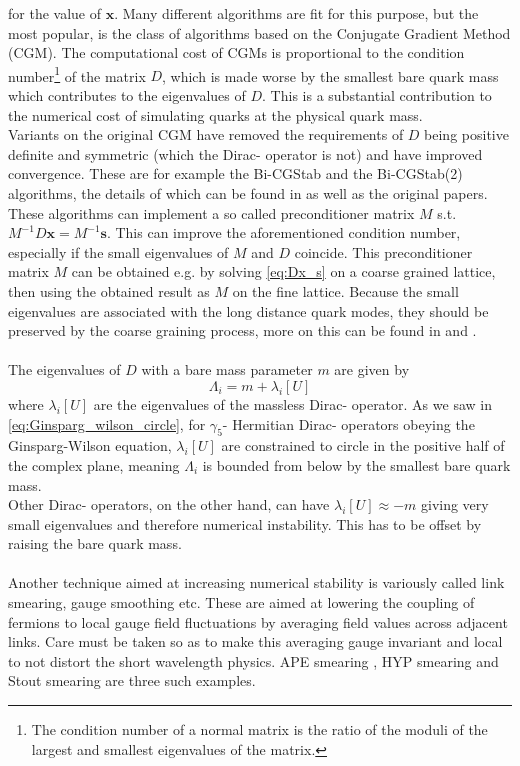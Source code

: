 \documentclass[a4paper,10pt]{book}
\begin{document}
for the value of $\boldsymbol{x}$. Many different algorithms are fit for this purpose, but the most popular, is the class of algorithms based on the Conjugate Gradient Method (CGM). The computational cost of CGMs is proportional to the condition number\footnote{The condition number of a normal matrix is the ratio of the moduli of the largest and smallest eigenvalues of the matrix.} of the matrix $D$, which is made worse by the smallest bare quark mass which contributes to the eigenvalues of $D$. This is a substantial contribution to the numerical cost of simulating quarks at the physical quark mass.\\ Variants on the original CGM have removed the requirements of $D$ being positive definite and symmetric (which the Dirac- operator is not) and have improved convergence. These are for example the Bi-CGStab  \cite{van1992bi} and the Bi-CGStab(2) \cite{gutknecht1993variants} algorithms, the details of which can be found in \cite{templates} as well as the original papers. These algorithms can implement a so called preconditioner matrix $M$ s.t. $M^{-1}D\boldsymbol{x}=M^{-1}\boldsymbol{s}$. This can improve the aforementioned condition number, especially if the small eigenvalues of $M$ and $D$ coincide. This preconditioner matrix $M$ can be obtained e.g. by solving \eqref{eq:Dx_s} on a coarse grained lattice, then using the obtained result as $M$ on the fine lattice. Because the small eigenvalues are associated with the long distance quark modes, they should be preserved by the coarse graining process, more on this can be found in \cite{2003} and \cite{2007}.\\\\The eigenvalues of $D$ with a bare mass parameter $m$ are given by
\begin{equation}
\Lambda_i = m+\lambda_i[U]
\end{equation}
where $\lambda_i[U]$ are the eigenvalues of the massless Dirac- operator. As we saw in \eqref{eq:Ginsparg_wilson_circle}, for $\gamma_5$- Hermitian Dirac- operators obeying the Ginsparg-Wilson equation, $\lambda_i[U]$ are constrained to circle in the positive half of the complex plane, meaning $\Lambda_i$ is bounded from below by the smallest bare quark mass.\\ Other Dirac- operators, on the other hand, can have $\lambda_i[U] \approx -m$ giving very small eigenvalues and therefore numerical instability. This has to be offset by raising the bare quark mass.\\\\Another technique aimed at increasing numerical stability is variously called link smearing, gauge smoothing etc. These are aimed at lowering the coupling of fermions to local gauge field fluctuations by averaging field values across adjacent links. Care must be taken so as to make this averaging gauge invariant and local to not distort the short wavelength physics. APE smearing \cite{albanese1987glueball}, HYP smearing \cite{PhysRevD.64.034504} and Stout smearing \cite{morningstar2004analytic} are three such examples.
\end{document}
